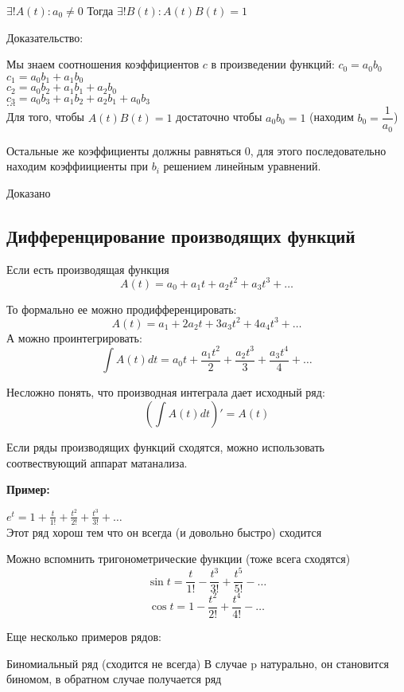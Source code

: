 $\exists! A(t) : a_{0} \neq 0$
Тогда $ \exists! B(t): A(t)B(t) = 1 $

Доказательство:

Мы знаем соотношения коэффициентов $ c $ в произведении функций:
$c_0 = a_0 b_0$	\\
$c_1 = a_0 b_1 + a_1 b_0 $ \\
$c_2 = a_0 b_2 + a_1 b_1 + a_2 b_0  $\\
$c_3 = a_0 b_3 + a_1 b_2 + a_2 b_1 + a_0 b_3$\\
$\ldots$\\

Для того, чтобы $ A(t)B(t) = 1 $ достаточно чтобы $ a_0 b_0 = 1 $ 
(находим $ b_{0} = \dfrac{1}{a_{0}} $)

Остальные же коэффициенты должны равняться 0, 
для этого последовательно находим коэффиициенты при $ b_{i} $ решением линейным уравнений.

Доказано

\subsection{Дифференцирование производящих функций}

Если есть производящая функция
$$
A(t) = a_0 + a_1 t + a_2 t^2 + a_3 t^3 + \ldots
$$

То формально ее можно продифференцировать:
$$
A(t) = a_1 + 2 a_2 t + 3 a_3 t^2 + 4 a_4 t^3 + \ldots
$$
А можно проинтегрировать:
$$
\int A(t) dt  = a_0 t + \frac{a_1 t^2}{2} + \frac{a_2 t^3}{3} + \frac{a_3 t^4}{4} + \ldots
$$

Несложно понять, что производная интеграла дает исходный ряд:
$$
(\int A(t) dt )' = A(t)
$$

Если ряды производящих функций сходятся, можно использовать соотвествующий аппарат матанализа.

\textbf{Пример:}

$ e^t = 1 + \frac{t}{1!} + \frac{t^{2}}{2!} + \frac{t^{3}}{3!} +\ldots$ \\

Этот ряд хорош тем что он всегда (и довольно быстро) сходится

Можно вспомнить тригонометрические функции (тоже всега сходятся)
$$
\sin t = \frac{t}{1!} - \frac{t^{3}}{3!} + \frac{t^{5}}{5!} - \ldots
$$
$$
\cos t = 1 - \frac{t^{2}}{2!} + \frac{t^{4}}{4!} - \ldots
$$

Еще несколько примеров рядов:

Биномиальный ряд (сходится не всегда)
В случае p натурально, он становится биномом, в обратном случае получается ряд

